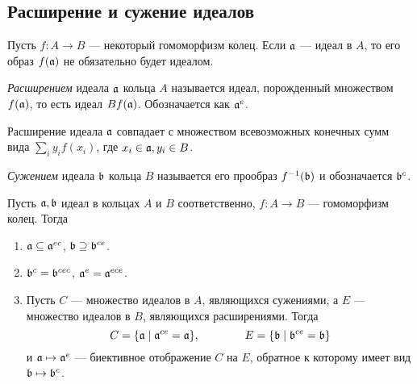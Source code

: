     \subsection{Расширение и сужение идеалов}
    Пусть $f : A \rightarrow B$ --- некоторый гомоморфизм колец. Если $\mathfrak{a}$ --- идеал в $A$, то его образ $f(\mathfrak{a})$ не обязательно будет идеалом.

    \begin{Def}
        \textit{Расширением} идеала $\mathfrak{a}$ кольца $A$ называется идеал, порожденный множеством $f(\mathfrak{a})$, то есть идеал $Bf(\mathfrak{a})$. Обозначается как $\mathfrak{a}^e$.
    \end{Def}
    Расширение идеала $\mathfrak{a}$ совпадает с множеством всевозможных конечных сумм вида $\sum_i y_if(x_i)$, где $x_i \in \mathfrak{a}, y_i \in B$.
    \begin{Def}
        \textit{Сужением} идеала $\mathfrak{b}$ кольца $B$ называется его прообраз $f^{-1}(\mathfrak{b})$ и обозначается $\mathfrak{b}^c$.
    \end{Def}

    \begin{Theorem}{\cite{A-M}}
        Пусть $\mathfrak{a, b}$ идеал в кольцах $A$ и $B$ соответственно, $f : A \rightarrow B$ --- гомоморфизм колец. Тогда
        \begin{enumerate}
            \item $\mathfrak{a} \subseteq \mathfrak{a}^{ec}$, $\mathfrak{b} \supseteq \mathfrak{b}^{ce}$.
            \item $\mathfrak{b}^c = \mathfrak{b}^{cec}$, $\mathfrak{a}^e = \mathfrak{a}^{ece}$.
            \item Пусть $C$ --- множество идеалов в $A$, являющихся сужениями, а $E$ --- множество идеалов в $B$, являющихся расширениями. Тогда 
            $$
                C = \{\mathfrak{a} \mid \mathfrak{a}^{ce} = \mathfrak{a}\}, \mspace{72mu} E = \{\mathfrak{b} \mid \mathfrak{b}^{ce} = \mathfrak{b}\}
            $$
            и $\mathfrak{a} \mapsto \mathfrak{a}^e$ --- биективное отображение $C$ на $E$, обратное к которому имеет вид $\mathfrak{b} \mapsto \mathfrak{b}^c$.
        \end{enumerate}
    \end{Theorem}
    

